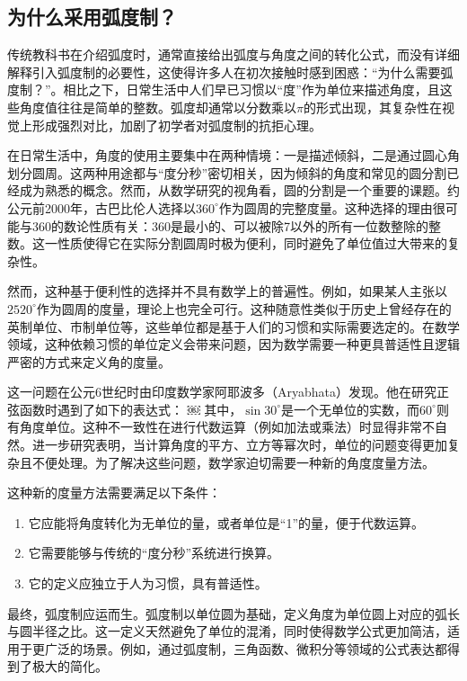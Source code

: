 \subsection{为什么采用弧度制？}

传统教科书在介绍弧度时，通常直接给出弧度与角度之间的转化公式，而没有详细解释引入弧度制的必要性，这使得许多人在初次接触时感到困惑：“为什么需要弧度制？”。相比之下，日常生活中人们早已习惯以“度”作为单位来描述角度，且这些角度值往往是简单的整数。弧度却通常以分数乘以$\pi$的形式出现，其复杂性在视觉上形成强烈对比，加剧了初学者对弧度制的抗拒心理。


在日常生活中，角度的使用主要集中在两种情境：一是描述倾斜，二是通过圆心角划分圆周。这两种用途都与“度分秒”密切相关，因为倾斜的角度和常见的圆分割已经成为熟悉的概念。然而，从数学研究的视角看，圆的分割是一个重要的课题。约公元前2000年，古巴比伦人选择以$360^\circ$作为圆周的完整度量。这种选择的理由很可能与360的数论性质有关：360是最小的、可以被除7以外的所有一位数整除的整数。这一性质使得它在实际分割圆周时极为便利，同时避免了单位值过大带来的复杂性。

然而，这种基于便利性的选择并不具有数学上的普遍性。例如，如果某人主张以$2520^\circ$作为圆周的度量，理论上也完全可行。这种随意性类似于历史上曾经存在的英制单位、市制单位等，这些单位都是基于人们的习惯和实际需要选定的。在数学领域，这种依赖习惯的单位定义会带来问题，因为数学需要一种更具普适性且逻辑严密的方式来定义角的度量。

这一问题在公元6世纪时由印度数学家阿耶波多（Aryabhata）发现。他在研究正弦函数时遇到了如下的表达式：
￼
其中，$\sin 30^\circ$是一个无单位的实数，而$60^\circ$则有角度单位。这种不一致性在进行代数运算（例如加法或乘法）时显得非常不自然。进一步研究表明，当计算角度的平方、立方等幂次时，单位的问题变得更加复杂且不便处理。为了解决这些问题，数学家迫切需要一种新的角度度量方法。

这种新的度量方法需要满足以下条件：
\begin{enumerate}
\item 它应能将角度转化为无单位的量，或者单位是“1”的量，便于代数运算。
\item 它需要能够与传统的“度分秒”系统进行换算。
\item 它的定义应独立于人为习惯，具有普适性。
\end{enumerate}

最终，弧度制应运而生。弧度制以单位圆为基础，定义角度为单位圆上对应的弧长与圆半径之比。这一定义天然避免了单位的混淆，同时使得数学公式更加简洁，适用于更广泛的场景。例如，通过弧度制，三角函数、微积分等领域的公式表达都得到了极大的简化。


